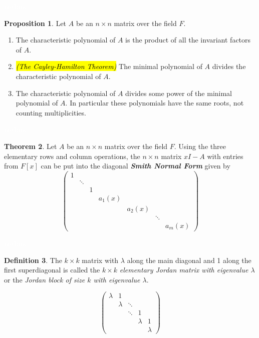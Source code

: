 \documentclass{article}
\theoremstyle{definition}
\newtheorem{thm}{Theorem}[section]
\newtheorem{prop}[thm]{Proposition}
\newtheorem{defn}[thm]{Definition}
\newcommand{\nl}{\textcolor{white}{nothing}}
\begin{document}
\nl

\begin{prop}
Let $A$ be an $n\times n$ matrix over the field $F$.
\begin{enumerate}
\item The characteristic polynomial of $A$ is the product of all the invariant factors of $A$.
\item \hl{\textit{(The Cayley-Hamilton Theorem)}} The minimal polynomial of $A$ divides the characteristic polynomial of $A$.
\item The characteristic polynomial of $A$ divides some power of the minimal polynomial of $A$. In particular these polynomials have the same roots, not counting multiplicities.
\end{enumerate}
\end{prop}

\nl

\begin{thm}
Let $A$ be an $n\times n$ matrix over the field $F$. Using the three elementary rows and column operations, the $n\times n$ matrix $xI - A$ with entries from $F[x]$ can be put into the diagonal \textit{\textbf{Smith Normal Form}} given by 
\[\begin{pmatrix}
1 & & & & & & \\
& \ddots & & & & & \\
& & 1 & & & & \\
& & & a_1(x) & & & \\
& & & & a_2(x) & & \\
& & & & & \ddots & \\
& & & & & & a_m(x)
\end{pmatrix}\]
\end{thm}

\nl

\begin{defn}
The $k\times k$ matrix with $\lambda$ along the main diagonal and 1 along the first superdiagonal is called the $k\times k$ \textit{elementary Jordan matrix with eigenvalue $\lambda$} or the \textit{Jordan block of size $k$ with eigenvalue $\lambda$}.
\end{defn}

\[\begin{pmatrix}
\lambda & 1 & & & \\
 & \lambda & \ddots & &\\
 & & \ddots & 1 & \\
 & & & \lambda & 1\\
 & & & & \lambda
\end{pmatrix}\]
\end{document}
